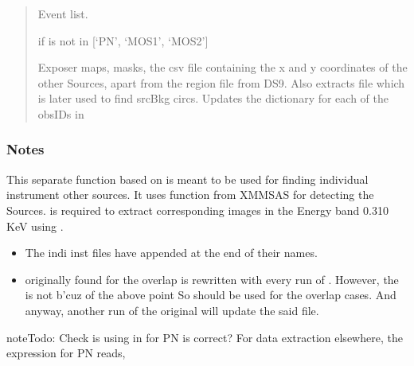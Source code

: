 \documentclass[letterpaper,10pt,english]{sphinxmanual}
\begin{document}
\begin{fulllineitems}
\begin{fulllineitems}
\begin{quote}
\begin{description}
\sphinxAtStartPar
{} Event list.

\sphinxAtStartPar
{} \textendash{} if  is not in {[}‘PN’, ‘MOS1’, ‘MOS2’{]}

\sphinxAtStartPar
Exposer maps, masks, the csv file containing the x and y coordinates of the other Sources,
apart from the region file from DS9.
Also extracts  file which is later used to find srcBkg circs.
Updates the  dictionary for each of the obsIDs in 

\end{description}\end{quote}
\subsubsection*{Notes}

\sphinxAtStartPar
This separate function based on  is meant to be used for
finding individual instrument other sources. It uses  function
from XMMSAS for detecting the Sources.
 is required to extract corresponding images in the Energy band
0.3\sphinxhyphen{}10 KeV using .
\begin{itemize}
\item {} 
\sphinxAtStartPar
The indi inst files have  appended at the end of their names.

\item {} 
\sphinxAtStartPar
{} originally found for the overlap is rewritten with every run
of . However, the  is not b’cuz of the above point
So  should be used for the overlap cases.
And anyway, another run of the original  will update the said file.

\end{itemize}

\begin{sphinxadmonition}{note}{\label{\detokenize{xmmPipeline:id1}}Todo:}
\sphinxAtStartPar
Check is using  in  for PN is correct?
For data extraction elsewhere, the expression for PN reads, 
\end{sphinxadmonition}


\end{fulllineitems}
\end{fulllineitems}
\end{document}
